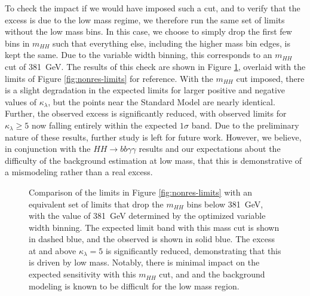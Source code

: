 To check the impact if we would have imposed such a cut, and to verify that the excess is due to the low mass regime, 
we therefore run the same set of limits without the low mass bins. In this case, we choose to simply drop the 
first few bins in $m_{HH}$ such that everything else, including the higher mass bin edges, is kept the same. Due to 
the variable width binning, this corresponds to an $m_{HH}$ cut of \SI{381}{\GeV}. The results of this check are shown 
in Figure \ref{fig:nonres-limits-with-cut}, overlaid with the limits of Figure \ref{fig:nonres-limits} for reference.
With the $m_{HH}$ cut imposed, there is a slight degradation in the expected limits for larger positive and negative 
values of $\kappa_{\lambda}$, but the points near the Standard Model are nearly identical. Further, the observed excess 
is significantly reduced, with observed limits for $\kappa_{\lambda} \geq 5$ now falling entirely within the expected 
$1\sigma$ band. Due to the preliminary nature of these results, further study is left for future work. However, 
we believe, in conjunction with the $HH\rightarrow bb\gamma\gamma$ results and our expectations about the difficulty 
of the background estimation at low mass, that this is demonstrative of a mismodeling rather than a real excess. 

\begin{figure}[ht]
  \centering
  \caption{\label{fig:nonres-limits-with-cut} Comparison of the limits in Figure \ref{fig:nonres-limits}
  with an equivalent set of limits that drop the $m_{HH}$ bins below \SI{381}{\GeV}, with the value 
  of \SI{381}{\GeV} determined by the optimized variable width binning. The expected limit band with 
  this mass cut is shown in dashed blue, and the observed is shown in solid blue. The excess 
  at and above $\kappa_{\lambda} = 5$ is significantly reduced, demonstrating that this is driven by 
  low mass. Notably, there is minimal impact on the expected sensitivity with this $m_{HH}$ cut, and 
  and the background modeling is known to be difficult for the low mass region.
  }
\end{figure}

